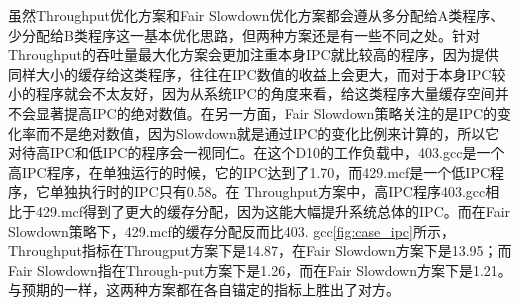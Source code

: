 虽然Throughput优化方案和Fair Slowdown优化方案都会遵从多分配给A类程序、少分配给B类程序这一基本优化思路，但两种方案还是有一些不同之处。针对Throughput的吞吐量最大化方案会更加注重本身IPC就比较高的程序，因为提供同样大小的缓存给这类程序，往往在IPC数值的收益上会更大，而对于本身IPC较小的程序就会不太友好，因为从系统IPC的角度来看，给这类程序大量缓存空间并不会显著提高IPC的绝对数值。在另一方面，Fair Slowdown策略关注的是IPC的变化率而不是绝对数值，因为Slowdown就是通过IPC的变化比例来计算的，所以它对待高IPC和低IPC的程序会一视同仁。在这个D10的工作负载中，403.gcc是一个高IPC程序，在单独运行的时候，它的IPC达到了1.70，而429.mcf是一个低IPC程序，它单独执行时的IPC只有0.58。在 Throughput方案中，高IPC程序403.gcc相比于429.mcf得到了更大的缓存分配，因为这能大幅提升系统总体的IPC。而在Fair Slowdown策略下，429.mcf的缓存分配反而比403. gcc\ref{fig:case_ipc}所示，Throughput指标在Througput方案下是14.87，在Fair Slowdown方案下是13.95；而Fair Slowdown指在Through-put方案下是1.26，而在Fair Slowdown方案下是1.21。与预期的一样，这两种方案都在各自锚定的指标上胜出了对方。